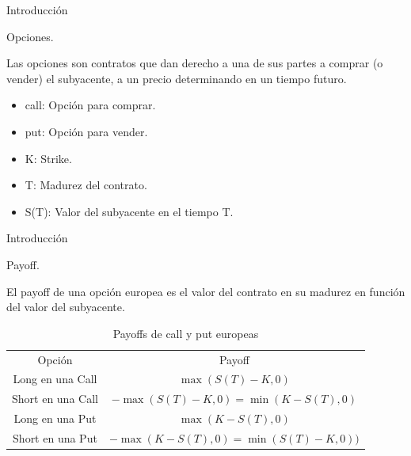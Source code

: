 \documentclass{beamer}
\begin{document}
\begin{frame}{Introducci\'on}

    \begin{block}{Opciones.}

    Las opciones son contratos que dan derecho a una de sus partes a comprar
    (o vender) el subyacente, a un precio determinando en un tiempo futuro.
    
    \begin{itemize}
      \item call: Opci\'on para comprar.
      \item put: Opci\'on para vender.
      \item K: Strike.
      \item T: Madurez del contrato.
      \item S(T): Valor del subyacente en el tiempo T.
    \end{itemize}


    \end{block}

\end{frame}



\begin{frame}{Introducci\'on}

  \begin{block}{Payoff.}

    El payoff de una opci\'on europea es el valor del contrato en su madurez en funci\'on del
    valor del subyacente.

  \end{block}
  
  \begin{table}[]
  \begin{center}
  \caption{Payoffs de call y put europeas}
  \label{cua:payoff}
    \begin{tabular}{|c|c|}
     \hline
      Opci\'on & Payoff \\  \hhline{|=|=|}
      Long en una Call & $\max(S(T) - K, 0)$ \\  \hline
      Short en una Call & $- \max(S(T) - K, 0) =\min(K - S(T), 0)$ \\ \hline
      Long en una Put & $\max(K - S(T), 0)$ \\ \hline
      Short en una Put & $-\max(K - S(T), 0) = \min(S(T) - K, 0))$\\ 
      \hline
    \end{tabular}
  \end{center}
  \end{table}  

\end{frame}
\end{document}
